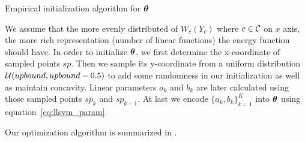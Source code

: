 \documentclass[sigconf, anonymous, review]{acmart}
\begin{document}
\begin{algorithm}[ht]
  \begin{algorithmic}[1]
       
    \ENDIF
    \ENDFOR
     
  \end{algorithmic}
  \caption{\label{alg:init_theta} Empirical initialization
    algorithm for $\boldsymbol{\theta}$}
\end{algorithm}

We assume that the more evenly distributed of $W_c(Y_c)$ where
$c\in{\cal C}$ on $x$ axis, the more rich representation (number of
linear functions) the energy function should have. In order to
initialize $\boldsymbol{\theta}$, we first determine the x-coordinate of
sampled points $sp$. Then we sample its y-coordinate from a
uniform distribution ${\cal U}(upbound,upbound-0.5)$ to add some
randomness in our initialization as well as maintain concavity.
Linear parameters $a_k$ and $b_k$ are later calculated using
those sampled points $sp_k$ and $sp_{k-1}$. At last we encode
$\{a_k,b_k\}_{k=1}^K$ into $\boldsymbol{\theta}$ using
equation~\eqref{eq:llsvm_param}.

Our optimization algorithm is summarized in
.
\end{document}
